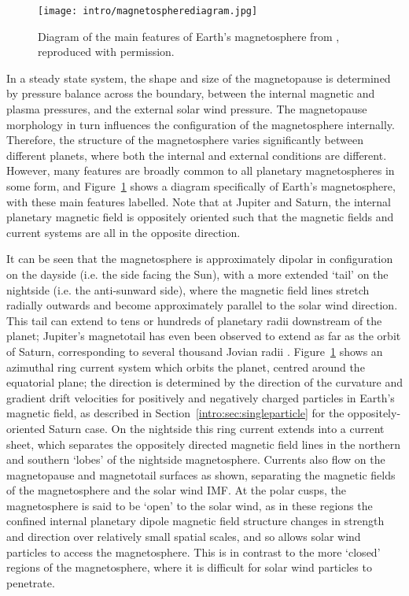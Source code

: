 \begin{figure}
\centering
\noindent\texttt{[image: intro/magnetospherediagram.jpg]}
\caption[Diagram of Earth's magnetosphere.]{Diagram of the main features of Earth's magnetosphere from \citet{russell2016}, reproduced with permission.}
\label{intro:fig:magnetosphere}
\end{figure}

In a steady state system, the shape and size of the magnetopause is determined by pressure balance across the boundary, between the internal magnetic and plasma pressures, and the external solar wind pressure. The magnetopause morphology in turn influences the configuration of the magnetosphere internally. Therefore, the structure of the magnetosphere varies significantly between different planets, where both the internal and external conditions are different. However, many features are broadly common to all planetary magnetospheres in some form, and Figure~\ref{intro:fig:magnetosphere} shows a diagram specifically of Earth's magnetosphere, with these main features labelled. Note that at Jupiter and Saturn, the internal planetary magnetic field is oppositely oriented such that the magnetic fields and current systems are all in the opposite direction.

It can be seen that the magnetosphere is approximately dipolar in configuration on the dayside (i.e. the side facing the Sun), with a more extended `tail' on the nightside (i.e. the anti-sunward side), where the magnetic field lines stretch radially outwards and become approximately parallel to the solar wind direction. This tail can extend to tens or hundreds of planetary radii downstream of the planet; Jupiter's magnetotail has even been observed to extend as far as the orbit of Saturn, corresponding to several thousand Jovian radii \citep{scarf1981}. Figure~\ref{intro:fig:magnetosphere} shows an azimuthal ring current system which orbits the planet, centred around the equatorial plane; the direction is determined by the direction of the curvature and gradient drift velocities for positively and negatively charged particles in Earth's magnetic field, as described in Section~\ref{intro:sec:singleparticle} for the oppositely-oriented Saturn case. On the nightside this ring current extends into a current sheet, which separates the oppositely directed magnetic field lines in the northern and southern `lobes' of the nightside magnetosphere. Currents also flow on the magnetopause and magnetotail surfaces as shown, separating the magnetic fields of the magnetosphere and the solar wind IMF. At the polar cusps, the magnetosphere is said to be `open' to the solar wind, as in these regions the confined internal planetary dipole magnetic field structure changes in strength and direction over relatively small spatial scales, and so allows solar wind particles to access the magnetosphere. This is in contrast to the more `closed' regions of the magnetosphere, where it is difficult for solar wind particles to penetrate.

